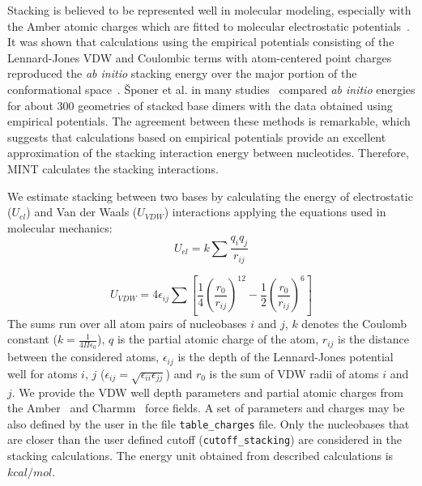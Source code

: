 \documentclass[12pt]{article}
\begin{document}

Stacking is believed to be represented well in molecular modeling, especially with the Amber atomic charges which are fitted to molecular electrostatic potentials~\cite{Hobza2008}. It was shown that calculations using the empirical potentials consisting of the Lennard-Jones VDW and Coulombic terms with atom-centered point charges reproduced the {\it ab initio} stacking energy over the major portion of the conformational space~\cite{Leszczynski2002}.
\v{S}poner et al. in many studies~\cite{Carter2000,Sponer1997, Base1996, Hobza1995} compared {\it ab initio} energies for about 300 geometries of stacked base dimers with the data obtained using empirical potentials. The agreement between these methods is remarkable, which suggests that calculations based on empirical potentials provide an excellent approximation of the stacking interaction energy between nucleotides. Therefore, MINT calculates the stacking interactions.

We estimate stacking between two bases by calculating the energy of electrostatic ($U_{el}$) and Van der Waals ($U_{VDW}$) interactions applying the equations used in molecular mechanics:
\begin{equation}
U_{el} = k \sum{\frac{q_i q_j}{r_{ij}}}
\end{equation}

\begin{equation}
U_{VDW} = 4 \epsilon_{ij} \sum{ \left[ \frac{1}{4} {\left( \frac{r_0}{r_{ij}} \right) }^{12} - \frac{1}{2} {\left( \frac{r_0}{r_{ij}} \right) }^{6} \right]}
\end{equation}
The sums run over all atom pairs of nucleobases $i$ and $j$, $k$ denotes the Coulomb constant ($k = \frac{1}{4 \Pi \epsilon_0}$), $q$ is the partial atomic charge of the atom, $r_{ij}$ is the distance between the considered atoms, $\epsilon_{ij}$ is the depth of the Lennard-Jones potential well for atoms $i$, $j$ ($\epsilon_{ij} = \sqrt{\epsilon_{ii}\epsilon_{jj}} $) and $r_0$ is the sum of VDW radii of atoms $i$ and $j$. We provide the VDW well depth parameters and partial atomic charges from the Amber~\cite{Wang2000} and Charmm~\cite{Mackerell2000,Foloppe2000} force fields. A set of parameters and charges may be also defined by the user in the file \texttt{table\_charges} file. Only the nucleobases that are closer than the user defined cutoff (\texttt{cutoff\_stacking}) are considered in the stacking calculations. The energy unit obtained from described calculations is $kcal/mol$. 
\end{document}
